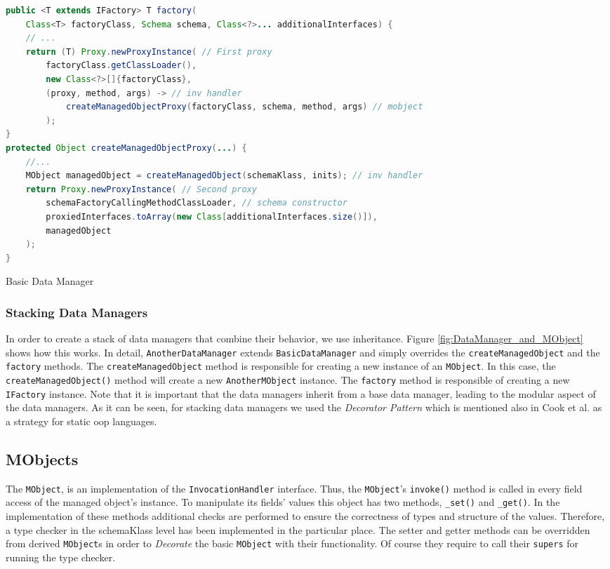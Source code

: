 \begin{sourcecode} [H]
	\begin{lstlisting}[language=Java, escapechar=|]
public <T extends IFactory> T factory(
	Class<T> factoryClass, Schema schema, Class<?>... additionalInterfaces) {
	// ...
	return (T) Proxy.newProxyInstance( // First proxy
		factoryClass.getClassLoader(),
		new Class<?>[]{factoryClass},
		(proxy, method, args) -> // inv handler
			createManagedObjectProxy(factoryClass, schema, method, args) // mobject
		);
}
protected Object createManagedObjectProxy(...) {
	//...
	MObject managedObject = createManagedObject(schemaKlass, inits); // inv handler
	return Proxy.newProxyInstance( // Second proxy
		schemaFactoryCallingMethodClassLoader, // schema constructor
		proxiedInterfaces.toArray(new Class[additionalInterfaces.size()]),
		managedObject
	);
}
\end{lstlisting}
	\caption{Basic Data Manager}
	\label{lst:Basic Data Manager}
\end{sourcecode}

\subsubsection{Stacking Data Managers}
In order to create a stack of data managers that combine their behavior, we use inheritance.
Figure \ref{fig:DataManager_and_MObject} shows how this works.
In detail, \texttt{AnotherDataManager} extends \texttt{BasicDataManager} and simply overrides the \texttt{createManagedObject} and the \texttt{factory} methods.
The \texttt{createManagedObject} method is responsible for creating a new instance of an \texttt{MObject}.
In this case, the \texttt{createManagedObject()} method will create a new \texttt{AnotherMObject} instance.
The \texttt{factory} method is responsible of creating a new \texttt{IFactory} instance.
Note that it is important that the data managers inherit from a base data manager, leading to the modular aspect of the data managers.
As it can be seen, for stacking data managers we used the \textit{Decorator Pattern} \cite{gamma1995design} which is mentioned also in Cook et al. \cite{loh2012managed} as a strategy for static \ac{oop} languages.

\subsection{MObjects}\label{sec:Managed Objects}
The \texttt{MObject}, is an implementation of the \texttt{InvocationHandler} interface.
Thus, the \texttt{MObject}'s \texttt{invoke()} method is called in every field access of the managed object's instance.
To manipulate its fields' values this object has two methods, \texttt{\_set()} and \texttt{\_get()}.
In the implementation of these methods additional checks are performed to ensure the correctness of types and structure of the values.
Therefore, a type checker in the schemaKlass level has been implemented in the particular place.
The setter and getter methods can be overridden from derived \texttt{MObject}s in order to \textit{Decorate} the basic \texttt{MObject} with their functionality. 
Of course they require to call their \texttt{supers} for running the type checker.


